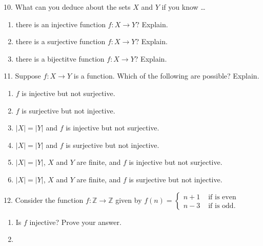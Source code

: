 \documentclass[10pt,]{book}
\theoremstyle{plain}
\theoremstyle{definition}
\theoremstyle{definition}
\theoremstyle{definition}
\numberwithin{equation}{section}
\def\Z{\mathbb Z}
\newcommand{\amp}{ & }
\begin{document}
\begin{exerciselist}
\item[10.]\hypertarget{exercise-36}{}
            What can you deduce about the sets \(X\) and \(Y\) if you know
            \dots{}
\leavevmode%
\begin{enumerate}[label=(\alph*)]
\item\hypertarget{li-344}{}
                there is an injective function \(f:X \to Y\)? Explain.
\item\hypertarget{li-345}{}
                there is a surjective function \(f:X \to Y\)? Explain.
\item\hypertarget{li-346}{}
                there is a bijectitve function \(f:X \to Y\)? Explain.
\end{enumerate}
\par\smallskip
\item[11.]\hypertarget{exercise-37}{}
            Suppose \(f:X \to Y\) is a function. Which of the following are possible? Explain.
\leavevmode%
\begin{enumerate}[label=(\alph*)]
\item\hypertarget{li-350}{}\(f\) is injective but not surjective.\item\hypertarget{li-351}{}\(f\) is surjective but not injective.\item\hypertarget{li-352}{}\(|X| = |Y|\) and \(f\) is injective but not surjective.\item\hypertarget{li-353}{}\(|X| = |Y|\) and \(f\) is surjective but not injective.\item\hypertarget{li-354}{}\(|X| = |Y|\), \(X\) and \(Y\) are finite, and \(f\) is injective but not surjective.\item\hypertarget{li-355}{}\(|X| = |Y|\), \(X\) and \(Y\) are finite, and \(f\) is surjective but not injective.\end{enumerate}
\par\smallskip
\item[12.]\hypertarget{exercise-38}{}
            Consider the function \(f:\Z \to \Z\) given by \(f(n) = \begin{cases}n+1 \amp  \mbox{ if  is even} \\ n-3 \amp \mbox{ if  is odd} . \end{cases}
            \)
\leavevmode%
\begin{enumerate}[label=(\alph*)]
\item\hypertarget{li-362}{}
                Is \(f\) injective? Prove your answer.
\item\hypertarget{li-363}{}

\end{enumerate}
\end{exerciselist}
\end{document}
